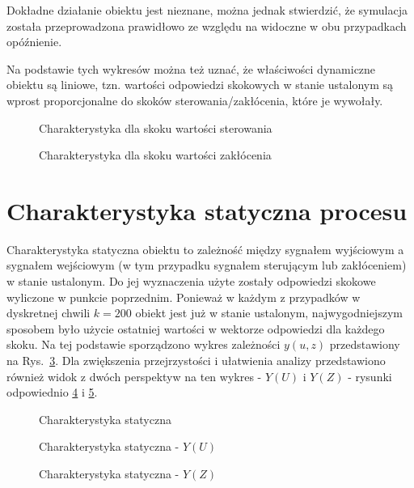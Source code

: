 Dokładne działanie obiektu jest nieznane, można jednak stwierdzić, że symulacja została przeprowadzona prawidłowo ze względu na widoczne w obu przypadkach opóźnienie.

Na podstawie tych wykresów można też uznać, że właściwości dynamiczne obiektu są liniowe, tzn. wartości odpowiedzi skokowych w stanie ustalonym są wprost proporcjonalne do skoków sterowania/zakłócenia, które je wywołały.

\begin{figure}
	\centering
	\caption{Charakterystyka dla skoku wartości sterowania}
	
	\label{osu}
\end{figure}

\begin{figure}
	\centering
	\caption{Charakterystyka dla skoku wartości zakłócenia}
	
	\label{osz}
\end{figure}

\section{Charakterystyka statyczna procesu}
Charakterystyka statyczna obiektu to zależność między sygnałem wyjściowym a sygnałem wejściowym (w tym przypadku sygnałem sterującym lub zakłóceniem) w stanie ustalonym. Do jej wyznaczenia użyte zostały odpowiedzi skokowe wyliczone w punkcie poprzednim. Ponieważ w każdym z przypadków w dyskretnej chwili $k=200$ obiekt jest już w stanie ustalonym, najwygodniejszym sposobem było użycie ostatniej wartości w wektorze odpowiedzi dla każdego skoku. Na tej podstawie sporządzono wykres zależności $y(u,z)$ przedstawiony na Rys.~\ref{sp}. Dla zwiększenia przejrzystości i ułatwienia analizy przedstawiono również widok z dwóch perspektyw na ten wykres - $Y(U)$ i $Y(Z)$ - rysunki odpowiednio \ref{spu} i \ref{spz}.

\begin{figure}
	\centering
	\caption{Charakterystyka statyczna}
	
	\label{sp}
\end{figure}

\begin{figure}
	\centering
	\caption{Charakterystyka statyczna - $Y(U)$}
	
	\label{spu}
\end{figure}

\begin{figure}
	\centering
	\caption{Charakterystyka statyczna - $Y(Z)$}
	
	\label{spz}
\end{figure}

